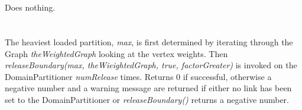  \\
  \\ 
Does nothing. \\

 \\
 \\ 
The heaviest loaded partition, {\em max}, is first determined by
iterating through the Graph {\em theWeightedGraph} looking at the
vertex weights. Then {\em releaseBoundary(max, theWieightedGraph,
true, factorGreater)} is invoked on the
DomainPartitioner {\em numRelease} times. Returns $0$ if successful,
otherwise a negative number and a warning message are returned if
either no link has been set to the DomainPartitioner or {\em
releaseBoundary()} returns a negative number. \\



